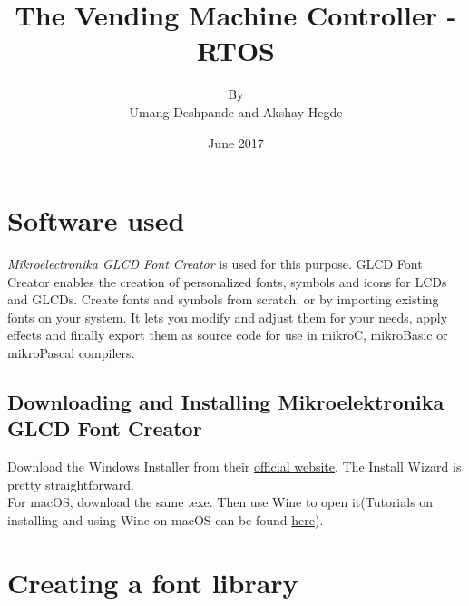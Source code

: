 \documentclass{article}
\title{The Vending Machine Controller - RTOS}
\author{By \\ Umang Deshpande and Akshay Hegde}
\date{June 2017}
\begin{document}
\maketitle

\section{Software used}
\qquad \textit{Mikroelectronika GLCD Font Creator} is used for this purpose. GLCD Font Creator enables the creation of personalized fonts, symbols and icons for LCDs and GLCDs. Create fonts and symbols from scratch, or by importing existing fonts on your system. It lets you modify and adjust them for your needs, apply effects and finally export them as source code for use in mikroC, mikroBasic or mikroPascal compilers.

\subsection{Downloading and Installing Mikroelektronika GLCD Font Creator}
Download the Windows Installer from their \href{https://download.mikroe.com/setups/additional-software/glcd-font-creator/glcd-font-creator-v120.zip}{official website}. The Install Wizard is pretty straightforward. \\
For macOS, download the same .exe. Then use Wine to open it(Tutorials on installing and using Wine on macOS can be found \href{https://www.davidbaumgold.com/tutorials/wine-mac/}{here}). 

\section{Creating a font library}
\end{document}
